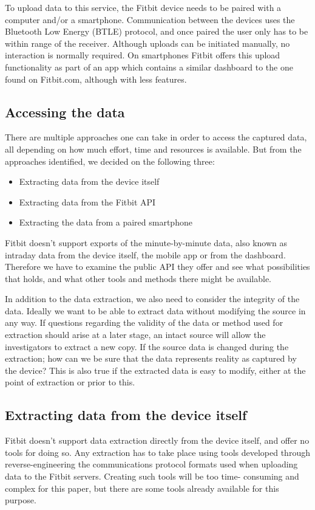 \documentclass[a4paper,11pt,dvips]{article}
\begin{document}
To upload data to this service, the Fitbit device needs to be paired with a computer and/or a smartphone. Communication between the devices uses the Bluetooth Low Energy (BTLE) protocol, and once paired the user only has to be within range of the receiver. Although uploads can be initiated manually, no interaction is normally required. On smartphones Fitbit offers this upload functionality as part of an app which contains a similar dashboard to the one found on Fitbit.com, although with less features.

\subsection{Accessing the data}
There are multiple approaches one can take in order to access the captured data, all depending on how much effort, time and resources is available. But from the approaches identified, we decided on the following three:

\begin{itemize}
\item Extracting data from the device itself
\item Extracting data from the Fitbit API
\item Extracting the data from a paired smartphone
\end{itemize}

Fitbit doesn't support exports of the minute-by-minute data, also known as intraday data from the device itself, the mobile app or from the dashboard. Therefore we have to examine the public API they offer and see what possibilities that holds, and what other tools and methods there might be available.

In addition to the data extraction, we also need to consider the integrity of the data. Ideally we want to be able to extract data without modifying the source in any way. If questions regarding the validity of the data or method used for extraction should arise at a later stage, an intact source will allow the investigators to extract a new copy. If the source data is changed during the extraction; how can we be sure that the data represents reality as captured by the device? This is also true if the extracted data is easy to modify, either at the point of extraction or prior to this.

\subsection{Extracting data from the device itself}
Fitbit doesn't support data extraction directly from the device itself, and offer no tools for doing so. Any extraction has to take place using tools developed through reverse-engineering the communications protocol formats used when uploading data to the Fitbit servers. Creating such tools will be too time- consuming and complex for this paper, but there are some tools already available for this purpose.
\end{document}
